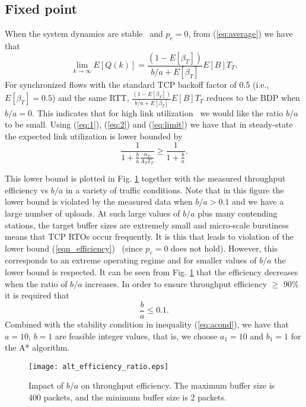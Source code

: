 \documentclass[10pt,twocolumn, journal]{IEEEtran}
\def\DLaddition#1{\noindent\ {\color{black} #1}}
\begin{document}
\subsection{Fixed point}\label{subsec_fixed_point}

When the system dynamics are stable\DLaddition{and $p_e=0$}, from (\ref{eq:average}) we have that
\begin{equation}\label{eq:limit}
\lim_{k\rightarrow \infty}E[Q(k)]=\frac{(1-E[\beta_T])}{b/a+E[\beta_T]}E[B]T_T.
\end{equation}
For synchronized flows with the standard TCP backoff factor of 0.5 (i.e.,
$E[\beta_T]=0.5$) and the same RTT, $\frac{(1-E[\beta_T])}{b/a+E[\beta_T]}E[B]T_T$
reduces to the BDP when $b/a=0$. This indicates that for high link utilization\DLaddition{we would like}
the ratio $b/a$ to be small.    Using (\ref{eq:1}), (\ref{eq:2}) and
(\ref{eq:limit}) we have that in steady-state the expected link utilization is lower
bounded by
\begin{equation}
   \frac{1}{1+\frac{b}{a}\frac{\alpha_T}{A_TT_T}}
    \geq \frac{1}{1+\frac{b}{a}}.
    \label{eqn_efficiency}
\end{equation}

This lower bound is plotted in Fig. \ref{fig_alt_efficiency} together with the measured throughput
efficiency vs $b/a$ in a variety of traffic conditions. Note that in this figure the lower bound is violated by the measured data when $b/a>0.1$ and we have a large number of uploads.   At such large values of $b/a$ plus many contending stations, the target buffer sizes are extremely small and micro-scale burstiness means that TCP RTOs occur frequently.  It is this that
leads to violation of the lower bound (\ref{eqn_efficiency})\DLaddition{(since $p_e=0$ does not hold)}.  However, this corresponds to an
extreme operating regime and for smaller values of $b/a$ the lower bound is
respected.   It can be seen from Fig. \ref{fig_alt_efficiency} that the
efficiency decreases when the ratio of $b/a$ increases. In order to ensure throughput
efficiency $\geq$ 90\% it is required that
\begin{equation}\label{eqn_fixed_point}
    \frac{b}{a} \leq 0.1.
\end{equation}
Combined with the stability condition in inequality (\ref{eq:acond}),
we have that $a=10$, $b=1$ are feasible integer values, that is, we choose $a_1=10$ and $b_1=1$ for the A* algorithm.

\begin{figure}[tb]
   \centering
   \texttt{[image: alt\_efficiency\_ratio.eps]}
   \caption{Impact of $b/a$ on throughput efficiency. The maximum buffer size is 400
   packets, and the minimum buffer size is 2 packets. }
   \label{fig_alt_efficiency}
\end{figure}
\end{document}
